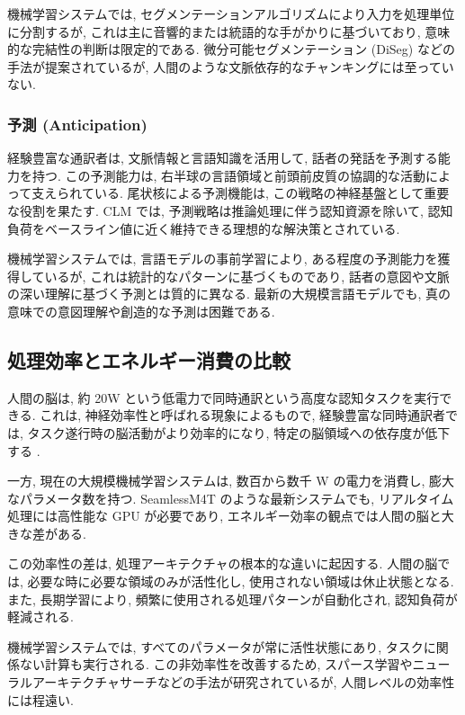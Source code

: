 機械学習システムでは, セグメンテーションアルゴリズムにより入力を処理単位に分割するが, これは主に音響的または統語的な手がかりに基づいており, 意味的な完結性の判断は限定的である.
微分可能セグメンテーション (DiSeg) などの手法が提案されているが, 人間のような文脈依存的なチャンキングには至っていない.

\subsubsection{予測 (Anticipation)}

経験豊富な通訳者は, 文脈情報と言語知識を活用して, 話者の発話を予測する能力を持つ.
この予測能力は, 右半球の言語領域と前頭前皮質の協調的な活動によって支えられている.
尾状核による予測機能は, この戦略の神経基盤として重要な役割を果たす.
CLM では, 予測戦略は推論処理に伴う認知資源を除いて, 認知負荷をベースライン値に近く維持できる理想的な解決策とされている.

機械学習システムでは, 言語モデルの事前学習により, ある程度の予測能力を獲得しているが, これは統計的なパターンに基づくものであり, 話者の意図や文脈の深い理解に基づく予測とは質的に異なる.
最新の大規模言語モデルでも, 真の意味での意図理解や創造的な予測は困難である.

\subsection{処理効率とエネルギー消費の比較}

人間の脳は, 約 20W という低電力で同時通訳という高度な認知タスクを実行できる.
これは, 神経効率性と呼ばれる現象によるもので, 経験豊富な同時通訳者では, タスク遂行時の脳活動がより効率的になり, 特定の脳領域への依存度が低下する \cite{hervais2015plasticity} .

一方, 現在の大規模機械学習システムは, 数百から数千 W の電力を消費し, 膨大なパラメータ数を持つ.
SeamlessM4T \cite{seamless2023m4t} のような最新システムでも, リアルタイム処理には高性能な GPU が必要であり, エネルギー効率の観点では人間の脳と大きな差がある.

この効率性の差は, 処理アーキテクチャの根本的な違いに起因する.
人間の脳では, 必要な時に必要な領域のみが活性化し, 使用されない領域は休止状態となる.
また, 長期学習により, 頻繁に使用される処理パターンが自動化され, 認知負荷が軽減される.

機械学習システムでは, すべてのパラメータが常に活性状態にあり, タスクに関係ない計算も実行される.
この非効率性を改善するため, スパース学習やニューラルアーキテクチャサーチなどの手法が研究されているが, 人間レベルの効率性には程遠い.

